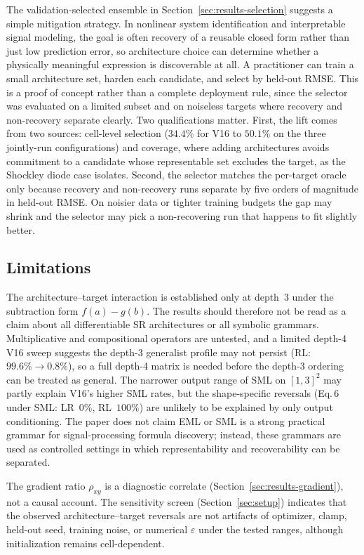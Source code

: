The validation-selected ensemble in
Section~\ref{sec:results-selection} suggests a simple mitigation
strategy.  In nonlinear system identification and interpretable
signal modeling, the goal is often recovery of a reusable
closed form rather than just low prediction error, so
architecture choice can determine whether a physically
meaningful expression is discoverable at all.  A practitioner
can train a small architecture set, harden each candidate, and
select by held-out RMSE.  This is a proof of concept rather than
a complete deployment rule, since the selector was evaluated on
a limited subset and on noiseless targets where recovery and
non-recovery separate clearly.  Two qualifications matter.
First, the lift comes from two sources: cell-level selection
($34.4\%$ for V16 to $50.1\%$ on the three jointly-run
configurations) and coverage, where adding architectures avoids
commitment to a candidate whose representable set excludes the
target, as the Shockley diode case isolates.  Second, the
selector matches the per-target oracle only because recovery
and non-recovery runs separate by five orders of magnitude in
held-out RMSE.  On noisier data or tighter training budgets the
gap may shrink and the selector may pick a non-recovering run
that happens to fit slightly better.

\subsection{Limitations}
\label{sec:limitations}

The architecture--target interaction is established only at depth~3
under the subtraction form $f(a)-g(b)$.  The results should
therefore not be read as a claim about all differentiable SR
architectures or all symbolic grammars.  Multiplicative and
compositional operators are untested, and a limited depth-4 V16
sweep suggests the depth-3 generalist profile may not persist
(RL: $99.6\%\to 0.8\%$), so a full depth-4 matrix is needed
before the depth-3 ordering can be treated as general.  The
narrower output range of SML on $[1,3]^2$ may partly explain
V16's higher SML rates, but the shape-specific reversals
(Eq.\,6 under SML: LR~$0\%$, RL~$100\%$) are unlikely to be
explained by only output conditioning.  The paper does not
claim EML or SML is a strong practical grammar for
signal-processing formula discovery; instead, these grammars
are used as controlled settings in which representability and
recoverability can be separated.

The gradient ratio $\rho_{xy}$ is a diagnostic correlate
(Section~\ref{sec:results-gradient}), not a causal account.  The
sensitivity screen (Section~\ref{sec:setup}) indicates that the
observed architecture--target reversals are not artifacts of
optimizer, clamp, held-out seed, training noise, or numerical
$\varepsilon$ under the tested ranges, although initialization
remains cell-dependent.

